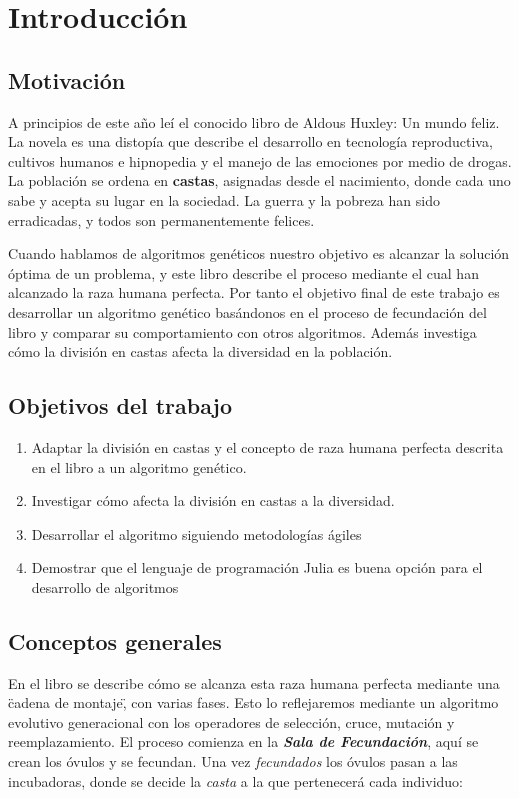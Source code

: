 \chapter{Introducción}

\section{Motivación}

A principios de este año leí el conocido libro de Aldous Huxley: Un mundo feliz. La novela es una
distopía que describe el desarrollo en tecnología reproductiva, cultivos humanos e hipnopedia y el manejo de las
emociones por medio de drogas. La población se ordena en \textbf{castas}, asignadas desde el nacimiento, donde cada uno
sabe y acepta su lugar en la sociedad. La guerra y la pobreza han sido erradicadas, y todos son permanentemente
felices.

Cuando hablamos de algoritmos genéticos nuestro objetivo es alcanzar la solución óptima de un problema, y este libro describe el 
proceso mediante el cual han alcanzado la raza humana perfecta. Por tanto el objetivo final de este trabajo es desarrollar
un algoritmo genético basándonos en el proceso de fecundación del libro y comparar su comportamiento con otros algoritmos. Además
investiga cómo la división en castas afecta la diversidad en la población.

\section{Objetivos del trabajo}

\begin{enumerate}
    \item Adaptar la división en castas y el concepto de raza humana perfecta descrita en el libro a un algoritmo genético.
    \item Investigar cómo afecta la división en castas a la diversidad.
    \item Desarrollar el algoritmo siguiendo metodologías ágiles
    \item Demostrar que el lenguaje de programación Julia es buena opción para el desarrollo de algoritmos
\end{enumerate}

\section{Conceptos generales}

En el libro se describe cómo se alcanza esta raza humana perfecta mediante una \"cadena de montaje\", con
varias fases. Esto lo reflejaremos mediante un algoritmo evolutivo generacional con los operadores de selección, cruce, mutación
y reemplazamiento. El proceso comienza en la \textbf{\textit{Sala de Fecundación}}, aquí se crean los óvulos y se fecundan. Una
vez \textit{fecundados} los óvulos pasan a las incubadoras, donde se decide la \textit{casta} a la que pertenecerá cada individuo:

